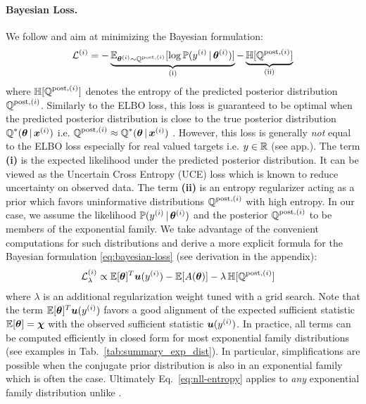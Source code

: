 \paragraph{Bayesian Loss.} We follow \cite{postnet} and aim at minimizing the Bayesian formulation:
%
\begin{equation}\label{eq:bayesian-loss}
    \mathcal{L}^{(i)} = - \underbrace{\operatorname{\mathbb{E}}_{\bm{\theta}^{(i)} \sim \operatorname{\mathbb{Q}}^{\text{post},(i)}}[\log \operatorname{\mathbb{P}}(y^{(i)}\,|\, \bm{\theta} ^{(i)})]}_\text{(i)} - \underbrace{\operatorname{\mathbb{H}}[\operatorname{\mathbb{Q}}^{\text{post},(i)}]}_\text{(ii)}
\end{equation}
%
where $\operatorname{\mathbb{H}}[\operatorname{\mathbb{Q}}^{\text{post},(i)}]$ denotes the entropy of the predicted posterior distribution $\operatorname{\mathbb{Q}}^{\text{post},(i)}$. Similarly to the ELBO loss, this loss is guaranteed to be optimal when the predicted posterior distribution is close to the true posterior distribution $\operatorname{\mathbb{Q}}^*(\bm{\theta} \,|\, \bm{x}^{(i)})$ i.e. $\operatorname{\mathbb{Q}}^{\text{post},(i)} \approx \operatorname{\mathbb{Q}}^*(\bm{\theta} \,|\, \bm{x}^{(i)})$ \citep{update-belief-propagation, PAC-bayesian_estimator, opt-info-processing_bayes}. However, this loss is generally \emph{not} equal to the ELBO loss especially for real valued targets i.e. $y \in \operatorname{\mathbb{R}}$ (see app.). The term \textbf{(i)} is the expected likelihood under the predicted posterior distribution. It can be viewed as the Uncertain Cross Entropy (UCE) loss \citep{uceloss} which is known to reduce uncertainty on observed data. The term \textbf{(ii)} is an entropy regularizer acting as a prior which favors uninformative distributions $\operatorname{\mathbb{Q}}^{\text{post},(i)}$ with high entropy. In our case, we assume the likelihood $\operatorname{\mathbb{P}}(y^{(i)}\,|\,\bm{\theta}^{(i)})$ and the posterior $\operatorname{\mathbb{Q}}^{\text{post},(i)}$ to be members of the exponential family. We take advantage of the convenient computations for such distributions and derive a more explicit formula for the Bayesian formulation \eqref{eq:bayesian-loss} (see derivation in the appendix):
%
\begin{equation}\label{eq:nll-entropy}
    \begin{aligned}
    \mathcal{L}_\lambda^{(i)} &\propto \operatorname{\mathbb{E}}[\bm{\theta}]^T \bm{u}(y^{(i)}) - \operatorname{\mathbb{E}}[A(\bm{\bm{\theta}})] - \lambda\operatorname{\mathbb{H}}[\operatorname{\mathbb{Q}}^{\text{post},(i)}]
    \end{aligned}
\end{equation}
%
where $\lambda$ is an additional regularization weight tuned with a grid search. Note that the term $\operatorname{\mathbb{E}}[\bm{\theta}]^T \bm{u}(y^{(i)}) $ favors a good alignment of the expected sufficient statistic $\operatorname{\mathbb{E}}[\bm{\theta}] = \bm{\chi}$ with the observed sufficient statistic $\bm{u}(y^{(i)})$. In practice, all terms can be computed efficiently in closed form for most exponential family distributions (see examples in Tab.~\ref{tab:summary_exp_dist}). In particular, simplifications are possible when the conjugate prior distribution is also in an exponential family which is often the case. Ultimately Eq.~\eqref{eq:nll-entropy} applies to \emph{any} exponential family distribution unlike \cite{postnet}.

